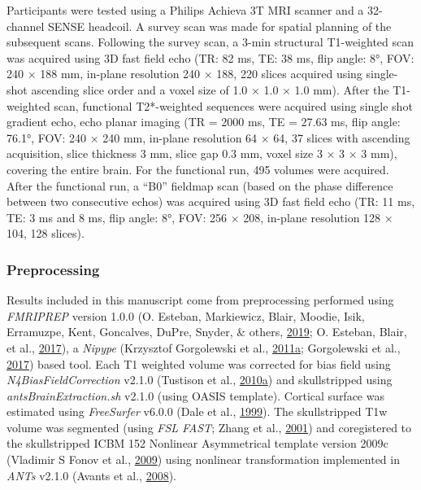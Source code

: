 \documentclass[11pt,american,a4paper,oneside,]{memoir} %
\begin{document}
Participants were tested using a Philips Achieva 3T MRI scanner and a 32-channel SENSE headcoil. A survey scan was made for spatial planning of the subsequent scans. Following the survey scan, a 3-min structural T1-weighted scan was acquired using 3D fast field echo (TR: 82 ms, TE: 38 ms, flip angle: 8°, FOV: 240 × 188 mm, in-plane resolution 240 × 188, 220 slices acquired using single-shot ascending slice order and a voxel size of 1.0 × 1.0 × 1.0 mm). After the T1-weighted scan, functional T2*-weighted sequences were acquired using single shot gradient echo, echo planar imaging (TR = 2000 ms, TE = 27.63 ms, flip angle: 76.1°, FOV: 240 × 240 mm, in-plane resolution 64 × 64, 37 slices with ascending acquisition, slice thickness 3 mm, slice gap 0.3 mm, voxel size 3 × 3 × 3 mm), covering the entire brain. For the functional run, 495 volumes were acquired. After the functional run, a ``B0'' fieldmap scan (based on the phase difference between two consecutive echos) was acquired using 3D fast field echo (TR: 11 ms, TE: 3 ms and 8 ms, flip angle: 8°, FOV: 256 × 208, in-plane resolution 128 × 104, 128 slices).

\hypertarget{morbid-curiosity-methods-imaging-details-preprocessing}{%
\subsubsection{Preprocessing}\label{morbid-curiosity-methods-imaging-details-preprocessing}}

Results included in this manuscript come from preprocessing performed using \emph{FMRIPREP} version 1.0.0 (O. Esteban, Markiewicz, Blair, Moodie, Isik, Erramuzpe, Kent, Goncalves, DuPre, Snyder, \& others, \protect\hyperlink{ref-esteban2019fmriprep}{2019}; O. Esteban, Blair, et al., \protect\hyperlink{ref-esteban_oscar_2017_1095198}{2017}), a \emph{Nipype} (Krzysztof Gorgolewski et al., \protect\hyperlink{ref-gorgolewski2011nipype}{2011}\protect\hyperlink{ref-gorgolewski2011nipype}{a}; Gorgolewski et al., \protect\hyperlink{ref-gorgolewski_krzysztof_j_2017_581704}{2017}) based tool. Each T1 weighted volume was corrected for bias field using \emph{N4BiasFieldCorrection} v2.1.0 (Tustison et al., \protect\hyperlink{ref-tustison2010n4itk}{2010}\protect\hyperlink{ref-tustison2010n4itk}{a}) and skullstripped using \emph{antsBrainExtraction.sh} v2.1.0 (using OASIS template). Cortical surface was estimated using \emph{FreeSurfer} v6.0.0 (Dale et al., \protect\hyperlink{ref-dale1999cortical}{1999}). The skullstripped T1w volume was segmented (using \emph{FSL FAST}; Zhang et al., \protect\hyperlink{ref-zhang2001segmentation}{2001}) and coregistered to the skullstripped ICBM 152 Nonlinear Asymmetrical template version 2009c (Vladimir S Fonov et al., \protect\hyperlink{ref-fonov2009unbiased}{2009}) using nonlinear transformation implemented in \emph{ANTs} v2.1.0 (Avants et al., \protect\hyperlink{ref-avants2008symmetric}{2008}).
\end{document}
